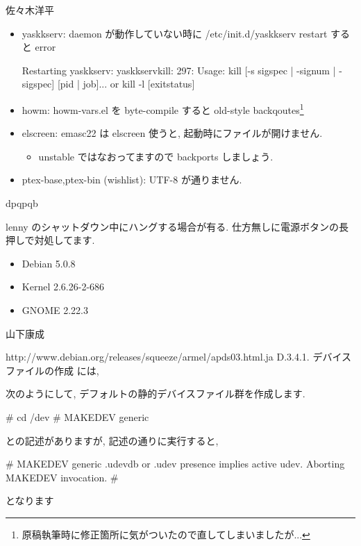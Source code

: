 \documentclass[mingoth,a4paper]{jsarticle}
\begin{document}
\begin{prework}{ 佐々木洋平 }
  \begin{itemize}
  \item yaskkserv: daemon が動作していない時に /etc/init.d/yaskkserv restart すると error
    \begin{commandline}
      Restarting yaskkserv: yaskkservkill: 297: Usage: kill [-s sigspec | -signum | -sigspec] [pid | job]... or
      kill -l [exitstatus]
    \end{commandline}
  \item howm: howm-vars.el を byte-compile すると old-style backqoutes\footnote{原稿執筆時に修正箇所に気がついたので直してしまいましたが...}
  \item elscreen: emasc22 は elscreen 使うと, 起動時にファイルが開けません.
    \begin{itemize}
    \item unstable ではなおってますので backports しましょう.
    \end{itemize}
  \item ptex-base,ptex-bin (wishlist): UTF-8 が通りません.
  \end{itemize}
\end{prework}

\begin{prework}{ dpqpqb }

lenny のシャットダウン中にハングする場合が有る.
仕方無しに電源ボタンの長押しで対処してます.
\begin{itemize}
\item Debian 5.0.8
\item Kernel 2.6.26-2-686
\item GNOME  2.22.3
\end{itemize}
\end{prework}

\begin{prework}{ 山下康成 }

http://www.debian.org/releases/squeeze/armel/apds03.html.ja
D.3.4.1. デバイスファイルの作成 には,
\begin{commandline}
次のようにして, デフォルトの静的デバイスファイル群を作成します.

# cd /dev
# MAKEDEV generic
\end{commandline}
との記述がありますが, 記述の通りに実行すると,
\begin{commandline}
# MAKEDEV generic
.udevdb or .udev presence implies active udev.  Aborting MAKEDEV invocation.
#
\end{commandline}
となります
\end{prework}
\end{document}
